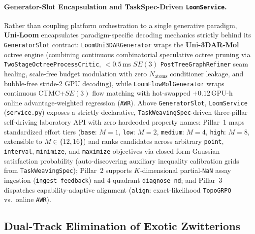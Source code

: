 \documentclass[11pt,a4paper]{article}
\begin{document}
\paragraph{Generator-Slot Encapsulation and TaskSpec-Driven \texttt{LoomService}.}
Rather than coupling platform orchestration to a single generative paradigm, \textbf{Uni-Loom} encapsulates paradigm-specific decoding mechanics strictly behind its \texttt{GeneratorSlot} contract: \texttt{Loom\allowbreak Uni3DAR\allowbreak Generator} wraps the \textbf{Uni-3DAR-Mol} octree engine \citep{chen2026uni3darmol} (combining continuous combinatorial speculative octree pruning via \texttt{TwoStage\allowbreak Octree\allowbreak Process\allowbreak Critic}, $<0.5\,\text{ms}$ $SE(3)$ \texttt{PostTree\allowbreak Graph\allowbreak Refiner} seam healing, scale-free budget modulation with zero $N_{\text{atoms}}$ conditioner leakage, and bubble-free stride-$2$ GPU decoding), while \texttt{Loom\allowbreak FlowMol\allowbreak Generator} wraps continuous CTMC+$SE(3)$ flow matching \citep{zeng2026propmolflow} with hot-swapped $+0.12\,\text{GPU-h}$ online advantage-weighted regression (\texttt{AWR}). Above \texttt{GeneratorSlot}, \texttt{LoomService} (\texttt{service.py}) exposes a strictly declarative, \texttt{TaskWeavingSpec}-driven three-pillar self-driving laboratory API with zero hardcoded property names: Pillar~1 maps standardized effort tiers (\texttt{base}: $M=1$, \texttt{low}: $M=2$, \texttt{medium}: $M=4$, \texttt{high}: $M=8$, extensible to $M\in\{12,16\}$) and ranks candidates across arbitrary \texttt{point}, \texttt{interval}, \texttt{minimize}, and \texttt{maximize} objectives via closed-form Gaussian satisfaction probability (auto-discovering auxiliary inequality calibration grids from \texttt{TaskWeavingSpec}); Pillar~2 supports $K$-dimensional partial-\texttt{NaN} assay ingestion (\texttt{ingest\_feedback}) and $4$-quadrant \texttt{diagnose\_nd}; and Pillar~3 dispatches capability-adaptive alignment (\texttt{align}: exact-likelihood \texttt{TopoGRPO} vs.\ online \texttt{AWR}).

\subsection{Dual-Track Elimination of Exotic Zwitterions}
\label{sec:valence}
\end{document}
